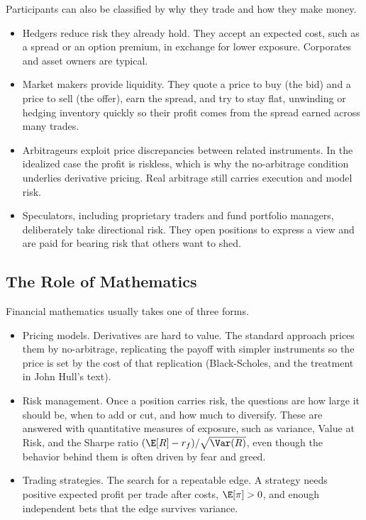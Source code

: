 Participants can also be classified by why they trade and how they make money.
\begin{itemize}[label=--]
    \item Hedgers reduce risk they already hold. They accept an expected cost, such as a spread or an option premium, in exchange for lower exposure. Corporates and asset owners are typical.
    \item Market makers provide liquidity. They quote a price to buy (the bid) and a price to sell (the offer), earn the spread, and try to stay flat, unwinding or hedging inventory quickly so their profit comes from the spread earned across many trades.
    \item Arbitrageurs exploit price discrepancies between related instruments. In the idealized case the profit is riskless, which is why the no-arbitrage condition underlies derivative pricing. Real arbitrage still carries execution and model risk.
    \item Speculators, including proprietary traders and fund portfolio managers, deliberately take directional risk. They open positions to express a view and are paid for bearing risk that others want to shed.
\end{itemize}

\bigskip

\subsection{The Role of Mathematics}

\medskip

Financial mathematics usually takes one of three forms.
\begin{itemize}[label=--]
    \item Pricing models. Derivatives are hard to value. The standard approach prices them by no-arbitrage, replicating the payoff with simpler instruments so the price is set by the cost of that replication (Black-Scholes, and the treatment in John Hull's text).
    \item Risk management. Once a position carries risk, the questions are how large it should be, when to add or cut, and how much to diversify. These are answered with quantitative measures of exposure, such as variance, Value at Risk, and the Sharpe ratio \((\E[R]-r_f)/\sqrt{\Var(R)}\), even though the behavior behind them is often driven by fear and greed.
    \item Trading strategies. The search for a repeatable edge. A strategy needs positive expected profit per trade after costs, \(\E[\pi] > 0\), and enough independent bets that the edge survives variance.
\end{itemize}

